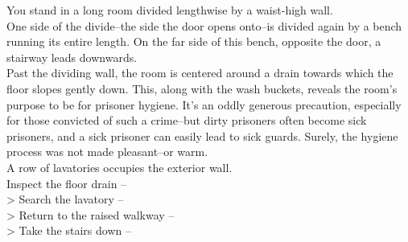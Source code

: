 You stand in a long room divided lengthwise by a waist-high wall.\\

One side of the divide--the side the door opens onto--is divided again by a bench running its entire length. On the far side of this bench, opposite the door, a stairway leads downwards.\\

Past the dividing wall, the room is centered around a drain towards which the floor slopes gently down. This, along with the wash buckets, reveals the room’s purpose to be for prisoner hygiene. It’s an oddly generous precaution, especially for those convicted of such a crime--but dirty prisoners often become sick prisoners, and a sick prisoner can easily lead to sick guards. Surely, the hygiene process was not made pleasant--or warm.\\

A row of lavatories occupies the exterior wall.\\

 Inspect the floor drain -- \\
> Search the lavatory -- \\
> Return to the raised walkway -- \\
> Take the stairs down -- 
